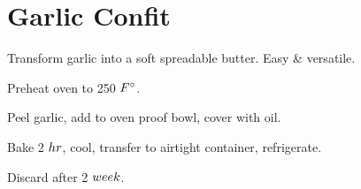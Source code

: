 \section[Garlic Confit]{Garlic Confit~}

\begin{recipestats}[
        servings=4~\fluidounce,
        preptime=5~\minute,
        bakingtime=2~\hour,
        original=\citeauthor{bonAppetitGarlic}~\cite{bonAppetitGarlic},
    ]
\end{recipestats}

\begin{recipeabstract}
    Transform garlic into a soft spreadable butter.
    Easy \& versatile.
\end{recipeabstract}

\begin{ingredientcolumns}
    \begin{ingredientblock}
    \end{ingredientblock}
    \begin{ingredientblock}
    \end{ingredientblock}
\end{ingredientcolumns}

\begin{preparation}
\item Preheat oven to 250 $\Fahrenheit$.
\item Peel garlic, add to oven proof bowl, cover with oil.
\item Bake 2 $\hour$, cool, transfer to airtight container, refrigerate.
\item Discard after 2 $\week$.
\end{preparation}

\recipeend%
